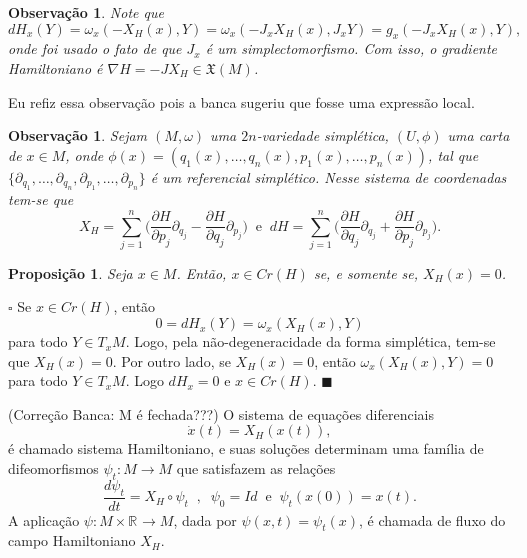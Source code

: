 \documentclass[12pt]{book}
\newtheorem{observacao}[teorema]{Observação}
\newtheorem{proposicao}[teorema]{Proposição}
\newenvironment{prova}[1]{$\square$ #1}{\hfill$\blacksquare$}
\newcommand{\campohamiltoniano}[1]{X_{H}(#1)}
\newcommand{\campohamiltonianoabrev}{X_{H}}
\newcommand{\campossuaves}[1]{\mathfrak{X}(#1)}
\newcommand{\derivada}[2]{\frac{d #1}{d #2}}
\newcommand{\derivadaparcial}[2]{\frac{\partial #1}{\partial #2}}
\newcommand{\pontoscriticos}[1]{\textit{Cr}(#1)}
\newcommand{\real}[1]{\mathbb{R}^{#1}}
\newcommand{\reta}{\real{}}
\newcommand{\alerta}[1]{{\color{red}#1}}
\newcommand{\correcaobanca}[1]{\alerta{(Correção Banca: #1)}}
\begin{document}
	\begin{observacao}
		Note que 
		$$
		dH_{x}(Y)=\omega_{x}(-X_{H}(x), Y) =\omega_{x}(-J_{x}X_{H}(x), J_{x}Y) =g_{x}(-J_{x}X_{H}(x), Y),$$
		onde foi usado o fato de que $J_{x}$ é um simplectomorfismo. Com isso, o gradiente Hamiltoniano é $\nabla H = -JX_{H} \in \campossuaves{M}$.
	\end{observacao}
	
	\alerta{Eu refiz essa observação pois a banca sugeriu que fosse uma expressão local.}
	\begin{observacao}
		Sejam $(M, \omega)$ uma $2n$-variedade simplética, $(U, \phi)$ uma carta de $x\in M$, onde $\phi(x)=(q_{1}(x), \dots, q_{n}(x), p_{1}(x), \dots, p_{n}(x))$, tal que $\{\partial_{q_{1}}, \dots , \partial_{q_{n}}, \partial_{p_{1}}, \dots, \partial_{p_{n}} \}$ é um referencial simplético. Nesse sistema de coordenadas tem-se que 
		$$
		\campohamiltonianoabrev = \sum_{j=1}^{n}\Big(\derivadaparcial{H}{p_{j}}\partial_{q_{j}}  - \derivadaparcial{H}{q_{j}}\partial_{p_{j}}  \Big)\;\;\text{e}\;\; dH =  \sum_{j=1}^{n}\Big(\derivadaparcial{H}{q_{j}}\partial_{q_{j}}  + \derivadaparcial{H}{p_{j}}\partial_{p_{j}}  \Big).
		$$
	\end{observacao}
	
	\begin{proposicao}
		Seja $x\in M$. Então, $x\in \pontoscriticos{H}$ se, e somente se, $\campohamiltoniano{x}=0$.
	\end{proposicao}
	\begin{prova}
		Se $x\in \pontoscriticos{H}$, então 
		$$
		0=dH_{x}(Y)=\omega_{x}(\campohamiltonianoabrev(x), Y)
		$$
		para todo $Y\in T_{x}M$. Logo, pela não-degeneracidade da forma simplética, tem-se que $\campohamiltoniano{x} =0$. Por outro lado, se $\campohamiltoniano{x} =0$, então $\omega_{x}(\campohamiltonianoabrev(x), Y)=0$ para todo $Y\in T_{x}M$. Logo $dH_{x}=0$ e $x\in \pontoscriticos{H}$.
	\end{prova}
	
	\correcaobanca{M é fechada???}
	O sistema de equações diferenciais
	$$
		\dot{x}(t)=\campohamiltoniano{x(t)},
	$$
	é chamado sistema Hamiltoniano, e suas soluções determinam uma família de difeomorfismos $\psi_{t}:M\to M$ que satisfazem as relações 
	$$
	\derivada{\psi_{t}}{t}=\campohamiltonianoabrev\circ\psi_{t} \;\;, \;\; \psi_{0}=Id \;\;\text{e}\;\;  \psi_{t}(x(0)) = x(t).
	$$
	A aplicação $\psi: M\times \reta \to M$, dada por $\psi(x,t)=\psi_{t}(x)$, é chamada de fluxo do campo Hamiltoniano $\campohamiltonianoabrev$.
	
\end{document}
